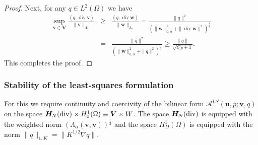 \documentclass[11pt]{amsart}
\numberwithin{equation}{section}
\theoremstyle{definition}\newtheorem{example}{Example}[section]
\begin{document}
\begin{proof}
Next, for any $q\in L^2(\Omega)$ we have  
\begin{eqnarray*}
\sup_{{{\mathbf v}}\in {{\boldsymbol V}}} \frac{(q,{\operatorname{div}} {{\mathbf v}})}{\|{{\mathbf v}}\|_{\Lambda_\alpha}} &\ge &
\frac{(q,{\operatorname{div}} {{\mathbf w}})}{\|{{\mathbf w}}\|_{\Lambda_\alpha}}=  
\frac{\|q\|^2}{ (\|{{\mathbf w}}\|_{0,\alpha}^2+\|{\operatorname{div}} {{\mathbf w}}\|^2)^\frac12}\\
& = & 
\frac{\|q\|^2}{( \|{{\mathbf w}}\|_{0,\alpha}^2+\|q\|^2)^\frac12}
\ge \frac{\|q\|}{\sqrt{C_P+1}}.
\end{eqnarray*}
This completes the proof.
\end{proof}

\subsubsection{Stability of the least-squares formulation}
For this we require continuity  and  coercivity of the bilinear form
${{\mathcal A}}^{LS}({{\mathbf u}},p; {{\mathbf v}},q)$
on the space $ {{\boldsymbol H}_{\hspace{-0.2mm}N}}({\operatorname{div}}) \times H^1_0(\Omega)\equiv {{\boldsymbol V}} \times W$. 
The   space $ {{\boldsymbol H}_{\hspace{-0.2mm}N}}({\operatorname{div}})$  is  
equipped with  the weighted norm 
$ (\Lambda_{{\alpha}}({{\mathbf v}},{{\mathbf v}}))^{\frac{1}{2}}$ and the  space $H^1_D(\Omega)$ is equipped with the
norm $\|q\|_{1,K}=\|K^{1/2}\nabla q\|$. 
\end{document}
